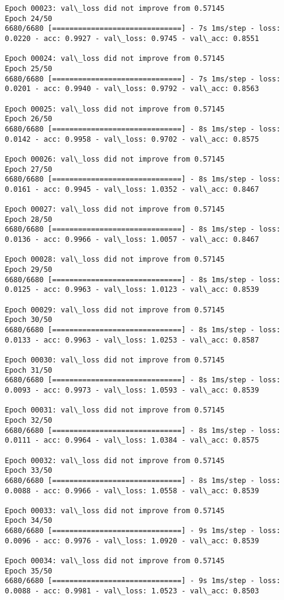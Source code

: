 \documentclass[11pt]{article}
\begin{document}
\begin{Verbatim}[commandchars=\\\{\}]
Epoch 00023: val\_loss did not improve from 0.57145
Epoch 24/50
6680/6680 [==============================] - 7s 1ms/step - loss: 0.0220 - acc: 0.9927 - val\_loss: 0.9745 - val\_acc: 0.8551

Epoch 00024: val\_loss did not improve from 0.57145
Epoch 25/50
6680/6680 [==============================] - 7s 1ms/step - loss: 0.0201 - acc: 0.9940 - val\_loss: 0.9792 - val\_acc: 0.8563

Epoch 00025: val\_loss did not improve from 0.57145
Epoch 26/50
6680/6680 [==============================] - 8s 1ms/step - loss: 0.0142 - acc: 0.9958 - val\_loss: 0.9702 - val\_acc: 0.8575

Epoch 00026: val\_loss did not improve from 0.57145
Epoch 27/50
6680/6680 [==============================] - 8s 1ms/step - loss: 0.0161 - acc: 0.9945 - val\_loss: 1.0352 - val\_acc: 0.8467

Epoch 00027: val\_loss did not improve from 0.57145
Epoch 28/50
6680/6680 [==============================] - 8s 1ms/step - loss: 0.0136 - acc: 0.9966 - val\_loss: 1.0057 - val\_acc: 0.8467

Epoch 00028: val\_loss did not improve from 0.57145
Epoch 29/50
6680/6680 [==============================] - 8s 1ms/step - loss: 0.0125 - acc: 0.9963 - val\_loss: 1.0123 - val\_acc: 0.8539

Epoch 00029: val\_loss did not improve from 0.57145
Epoch 30/50
6680/6680 [==============================] - 8s 1ms/step - loss: 0.0133 - acc: 0.9963 - val\_loss: 1.0253 - val\_acc: 0.8587

Epoch 00030: val\_loss did not improve from 0.57145
Epoch 31/50
6680/6680 [==============================] - 8s 1ms/step - loss: 0.0093 - acc: 0.9973 - val\_loss: 1.0593 - val\_acc: 0.8539

Epoch 00031: val\_loss did not improve from 0.57145
Epoch 32/50
6680/6680 [==============================] - 8s 1ms/step - loss: 0.0111 - acc: 0.9964 - val\_loss: 1.0384 - val\_acc: 0.8575

Epoch 00032: val\_loss did not improve from 0.57145
Epoch 33/50
6680/6680 [==============================] - 8s 1ms/step - loss: 0.0088 - acc: 0.9966 - val\_loss: 1.0558 - val\_acc: 0.8539

Epoch 00033: val\_loss did not improve from 0.57145
Epoch 34/50
6680/6680 [==============================] - 9s 1ms/step - loss: 0.0096 - acc: 0.9976 - val\_loss: 1.0920 - val\_acc: 0.8539

Epoch 00034: val\_loss did not improve from 0.57145
Epoch 35/50
6680/6680 [==============================] - 9s 1ms/step - loss: 0.0088 - acc: 0.9981 - val\_loss: 1.0523 - val\_acc: 0.8503


\end{Verbatim}
\end{document}
